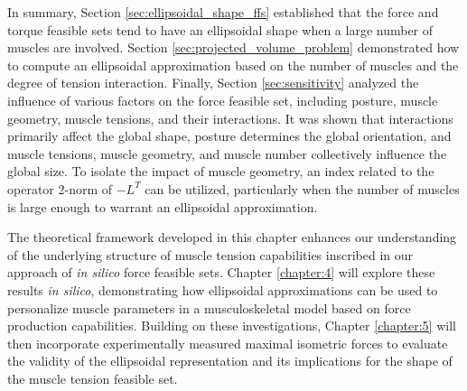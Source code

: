 In summary, Section \ref{sec:ellipsoidal_shape_ffs} established that the force and torque feasible sets tend to have an ellipsoidal shape when a large number of muscles are involved. Section \ref{sec:projected_volume_problem} demonstrated how to compute an ellipsoidal approximation based on the number of muscles and the degree of tension interaction. Finally, Section \ref{sec:sensitivity} analyzed the influence of various factors on the force feasible set, including posture, muscle geometry, muscle tensions, and their interactions.  It was shown that interactions primarily affect the global shape, posture determines the global orientation, and muscle tensions, muscle geometry, and muscle number collectively influence the global size. To isolate the impact of muscle geometry, an index related to the operator 2-norm of $-L^T$ can be utilized, particularly when the number of muscles is large enough to warrant an ellipsoidal approximation.

The theoretical framework developed in this chapter enhances our understanding of the underlying structure of muscle tension capabilities inscribed in our approach of \emph{in silico} force feasible sets. Chapter \ref{chapter:4} will explore these results \emph{in silico}, demonstrating how ellipsoidal approximations can be used to personalize muscle parameters in a musculoskeletal model based on force production capabilities. Building on these investigations, Chapter \ref{chapter:5} will then incorporate experimentally measured maximal isometric forces to evaluate the validity of the ellipsoidal representation and its implications for the shape of the muscle tension feasible set.